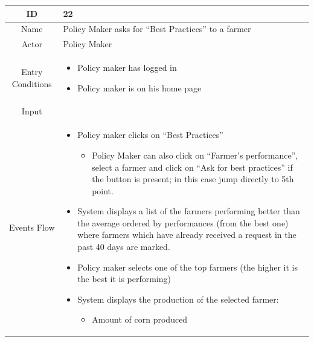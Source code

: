 \documentclass{article}
\begin{document}
\begin{center}
    \newpage
    
    
    
    
    
    
    
    \begin{longtable}{|c| p{10cm}|}
        \hline
            ID & 22 \\
        \hline
            Name & Policy Maker asks for “Best Practices” to a farmer \\
        \hline
            Actor & Policy Maker \\
        \hline
            Entry Conditions &  \begin{itemize}
                                    \item Policy maker has logged in
                                    \item Policy maker is on his home page
                                \end{itemize}\\
        \hline
            Input &  \\
        \hline
            Events Flow &   \begin{itemize}
                                \item Policy maker clicks on “Best Practices” 
                                                \begin{itemize}
                                                    \item Policy Maker can also click on “Farmer’s performance”, select a farmer and click on “Ask for best practices” if the button is present; in this case jump directly to 5th point.
                                                \end{itemize}
                                \item System displays a list of the farmers performing better than the average ordered by performances (from the best one) where farmers which have already received a request in the past 40 days are marked.
                                \item Policy maker selects one of the top farmers (the higher it is the best it is performing)
                                \item System displays the production of the selected farmer:
                                                \begin{itemize}
                                                    \item Amount of corn produced

\end{itemize}
\end{itemize}
\end{longtable}
\end{center}
\end{document}
